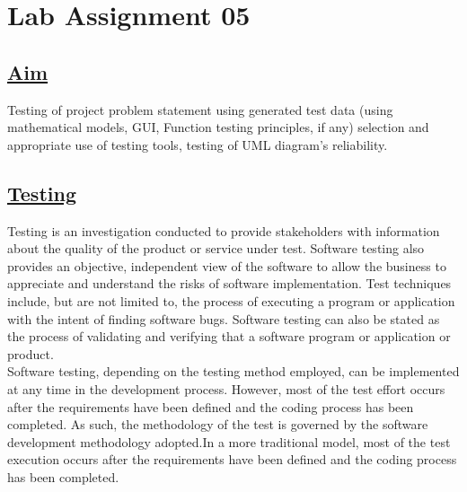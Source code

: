 \newpage
\section*{\centering\LARGE{Lab Assignment 05}}
\subsection*{\underline{Aim}}
Testing of project problem statement using generated test data (using mathematical models, GUI, Function testing principles, if any) selection and appropriate use of testing tools, testing of UML diagram's reliability.
\noindent
\subsection*{\underline{Testing}}
\hspace{5em}Testing is an investigation conducted to provide stakeholders with information about the quality of the product or service under test. Software testing also provides an objective, independent view of the software to allow the business to appreciate and understand the risks of software implementation. Test techniques include, but are not limited to, the process of executing a program or application with the intent of finding software bugs. Software testing can also be stated as the process of validating and verifying that a software program or application or product.\\

\noindent
\hspace{5em}Software testing, depending on the testing method employed, can be implemented at any time in the development process. However, most of the test effort occurs after the requirements have been defined and the coding process has been completed. As such, the methodology of the test is governed by the software development methodology adopted.In a more traditional model, most of the test execution occurs after the requirements have been defined and the coding process has been completed.


